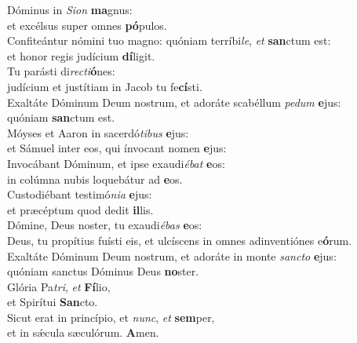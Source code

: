 \evenverse Dóminus in \textit{Si}\textit{on} \textbf{ma}gnus:~\*\\
\evenverse et excélsus super omnes \textbf{pó}pulos.\\
\oddverse Confiteántur nómini tuo magno: quóniam terríbi\textit{le}, \textit{et} \textbf{san}ctum est:~\*\\
\oddverse et honor regis judícium \textbf{dí}ligit.\\
\evenverse Tu parásti di\textit{re}\textit{cti}\textbf{ó}nes:~\*\\
\evenverse judícium et justítiam in Jacob tu fe\textbf{cí}sti.\\
\oddverse Exaltáte Dóminum Deum nostrum, et adoráte scabéllum \textit{pe}\textit{dum} \textbf{e}jus:~\*\\
\oddverse quóniam \textbf{san}ctum est.\\
\evenverse Móyses et Aaron in sacerdó\textit{ti}\textit{bus} \textbf{e}jus:~\*\\
\evenverse et Sámuel inter eos, qui ínvocant nomen \textbf{e}jus:\\
\oddverse Invocábant Dóminum, et ipse exaudi\textit{é}\textit{bat} \textbf{e}os:~\*\\
\oddverse in colúmna nubis loquebátur ad \textbf{e}os.\\
\evenverse Custodiébant testimó\textit{ni}\textit{a} \textbf{e}jus:~\*\\
\evenverse et præcéptum quod dedit \textbf{il}lis.\\
\oddverse Dómine, Deus noster, tu exaudi\textit{é}\textit{bas} \textbf{e}os:~\*\\
\oddverse Deus, tu propítius fuísti eis, et ulcíscens in omnes adinventiónes e\textbf{ó}rum.\\
\evenverse Exaltáte Dóminum Deum nostrum, et adoráte in monte \textit{san}\textit{cto} \textbf{e}jus:~\*\\
\evenverse quóniam sanctus Dóminus Deus \textbf{no}ster.\\
\oddverse Glória Pa\textit{tri}, \textit{et} \textbf{Fí}lio,~\*\\
\oddverse et Spirítui \textbf{San}cto.\\
\evenverse Sicut erat in princípio, et \textit{nunc}, \textit{et} \textbf{sem}per,~\*\\
\evenverse et in sǽcula sæculórum. \textbf{A}men.\\
